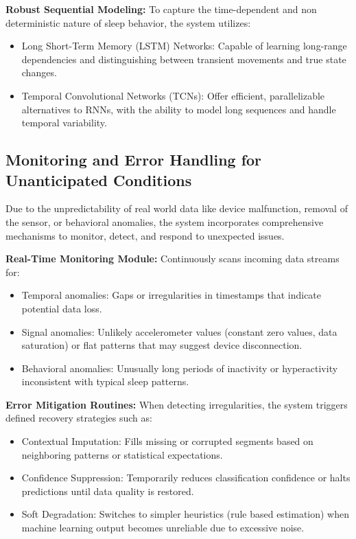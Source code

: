 \documentclass[conference]{IEEEtran}
\begin{document}
\item \textbf{Robust Sequential Modeling:}  
To capture the time-dependent and non deterministic nature of sleep behavior, the system utilizes:
\begin{itemize}
    \item Long Short-Term Memory (LSTM) Networks: Capable of learning long-range dependencies and distinguishing between transient movements and true state changes.
    \item Temporal Convolutional Networks (TCNs): Offer efficient, parallelizable alternatives to RNNs, with the ability to model long sequences and handle temporal variability.
\end{itemize}

\subsection{Monitoring and Error Handling for Unanticipated Conditions}

Due to the unpredictability of real world data like device malfunction, removal of the sensor, or behavioral anomalies, the system incorporates comprehensive mechanisms to monitor, detect, and respond to unexpected issues.

\item \textbf{Real-Time Monitoring Module:}
Continuously scans incoming data streams for:

\begin{itemize}
\item Temporal anomalies: Gaps or irregularities in timestamps that indicate potential data loss.
\item Signal anomalies: Unlikely accelerometer values (constant zero values, data saturation) or flat patterns that may suggest device disconnection.
\item Behavioral anomalies: Unusually long periods of inactivity or hyperactivity inconsistent with typical sleep patterns.
\end{itemize}

\item \textbf{Error Mitigation Routines:}
When detecting irregularities, the system triggers defined recovery strategies such as:
\begin{itemize}
    \item Contextual Imputation: Fills missing or corrupted segments based on neighboring patterns or statistical expectations.
    \item Confidence Suppression: Temporarily reduces classification confidence or halts predictions until data quality is restored.
    \item Soft Degradation: Switches to simpler heuristics (rule based estimation) when machine learning output becomes unreliable due to excessive noise.
\end{itemize}
\end{document}

